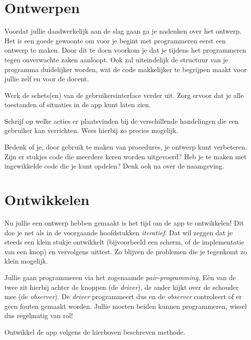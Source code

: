 \section{Ontwerpen}
Voordat jullie daadwerkelijk aan de slag gaan ga je nadenken over het ontwerp. Het is een goede gewoonte om voor je begint met programmeren eerst een ontwerp te maken. Door dit te doen voorkom je dat je tijdens het programmeren tegen onverwachte zaken aanloopt. Ook zal uiteindelijk de structuur van je programma duidelijker worden, wat de code makkelijker te begrijpen maakt voor jullie zelf en voor de docent.

\begin{opgave}
	\opgVraag
	Werk de schets(en) van de gebruikersinterface verder uit. Zorg ervoor dat je alle toestanden of situaties in de app kunt laten zien.
\end{opgave}

\begin{opgave}
	\opgVraag
	Schrijf op welke acties er plaatsvinden bij de verschillende handelingen die een gebruiker kan verrichten. Wees hierbij zo precies mogelijk.
\end{opgave}

\begin{opgave}
	\opgVraag
	Bedenk of je, door gebruik te maken van procedures, je ontwerp kunt verbeteren. Zijn er stukjes code die meerdere keren worden uitgevoerd? Heb je te maken met ingewikkelde code die je kunt opdelen? Denk ook na over de naamgeving.
\end{opgave}

\section{Ontwikkelen}
Nu jullie een ontwerp hebben gemaakt is het tijd om de app te ontwikkelen! Dit doe je net als in de voorgaande hoofdstukken \emph{iteratief}. Dat wil zeggen dat je steeds een klein stukje ontwikkelt (bijvoorbeeld een scherm, of de implementatie van een knop) en vervolgens uittest. Zo blijven de problemen die je tegenkomt zo klein mogelijk. 

Jullie gaan programmeren via het zogenaamde \emph{pair-programming}. E\'en van de twee zit hierbij achter de knoppen (de \emph{driver}), de ander kijkt over de schouder mee (de \emph{observer}). De \emph{driver} programmeert dus en de \emph{observer} controleert of er geen fouten gemaakt worden. Jullie moeten beiden kunnen programmeren, wissel dus regelmatig van rol!

\begin{opgave}
	\opgVraag
	Ontwikkel de app volgens de hierboven beschreven methode.
\end{opgave}

